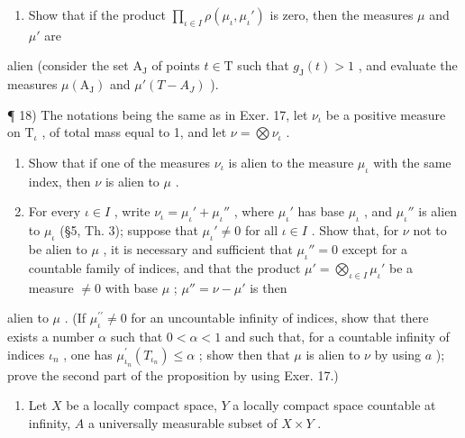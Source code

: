 \begin{enumerate}
\def\labelenumi{\alph{enumi})}
\setcounter{enumi}{1}
\tightlist
\item
  Show that if the product \(\prod_{\iota \in I} \rho(\mu_{\iota}, \mu_{\iota}')\) is zero, then the measures \(\mu\) and \(\mu'\) are
\end{enumerate}

alien (consider the set \(\mathrm{A_J}\) of points \(t\in \mathrm{T}\) such that \(g_{\mathrm{J}}(t) > 1\) , and evaluate the measures \(\mu (\mathrm{A_J})\) and \(\mu '(T - A_J)\) ).

¶ 18) The notations being the same as in Exer. 17, let \(\nu_{\iota}\) be a positive measure on \(\mathrm{T}_{\iota}\) , of total mass equal to 1, and let \(\nu = \bigotimes \nu_{\iota}\) .

\begin{enumerate}
\def\labelenumi{\alph{enumi})}
\item
  Show that if one of the measures \(\nu_{\iota}\) is alien to the measure \(\mu_{\iota}\) with the same index, then \(\nu\) is alien to \(\mu\) .
\item
  For every \(\iota \in I\) , write \(\nu_{\iota} = \mu_{\iota}' + \mu_{\iota}''\) , where \(\mu_{\iota}'\) has base \(\mu_{\iota}\) , and \(\mu_{\iota}''\) is alien to \(\mu_{\iota}\) (§5, Th. 3); suppose that \(\mu_{\iota}' \neq 0\) for all \(\iota \in I\) . Show that, for \(\nu\) not to be alien to \(\mu\) , it is necessary and sufficient that \(\mu_{\iota}'' = 0\) except for a countable family of indices, and that the product \(\mu' = \bigotimes_{\iota \in I} \mu_{\iota}'\) be a measure \(\neq 0\) with base \(\mu\) ; \(\mu'' = \nu - \mu'\) is then
\end{enumerate}

alien to \(\mu\) . (If \(\mu_{\iota}^{\prime\prime} \neq 0\) for an uncountable infinity of indices, show that there exists a number \(\alpha\) such that \(0 < \alpha < 1\) and such that, for a countable infinity of indices \(\iota_{n}\) , one has \(\mu_{\iota_{n}}^{\prime}(T_{\iota_{n}}) \leqslant \alpha\) ; show then that \(\mu\) is alien to \(\nu\) by using \(a\) ); prove the second part of the proposition by using Exer. 17.)

\begin{enumerate}
\def\labelenumi{\arabic{enumi})}
\setcounter{enumi}{18}
\tightlist
\item
  Let \(X\) be a locally compact space, \(Y\) a locally compact space countable at infinity, \(A\) a universally measurable subset of \(X \times Y\) .
\end{enumerate}

